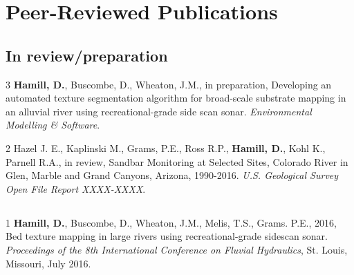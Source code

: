 \documentclass[margin,line]{resume}
\begin{document}
\begin{resume}
\begin{footnotesize}
        \end{footnotesize}

    \section{\mysidestyle Peer-Reviewed Publications}

    \begin{footnotesize}

	\subsection{\mysidestyle In review/preparation}
	\begin{list1}
		
	\item[3] {\bf Hamill, D.}, Buscombe, D., Wheaton, J.M., in preparation, Developing an automated texture segmentation algorithm for broad-scale substrate mapping in an alluvial river using recreational-grade side scan sonar. {\sl Environmental Modelling \& Software}. \\
		
	\item[2] Hazel J. E., Kaplinski M., Grams, P.E., Ross R.P., {\bf Hamill, D.}, Kohl K., Parnell R.A., in review, Sandbar Monitoring at Selected Sites, Colorado River in Glen, Marble and Grand Canyons, Arizona, 1990-2016. {\sl U.S. Geological Survey Open File Report XXXX-XXXX}.\\
	
	\end{list1}
	
	\subsection{}
	\begin{list1}
		
     \item[1] {\bf Hamill, D.}, Buscombe, D., Wheaton, J.M., Melis, T.S., Grams. P.E., 2016, Bed texture mapping in large rivers using recreational-grade sidescan sonar. {\sl Proceedings of the 8th International Conference on Fluvial Hydraulics}, St. Louis, Missouri, July 2016.\\

	\end{list1}

    \end{footnotesize}
    

\end{resume}
\end{document}
